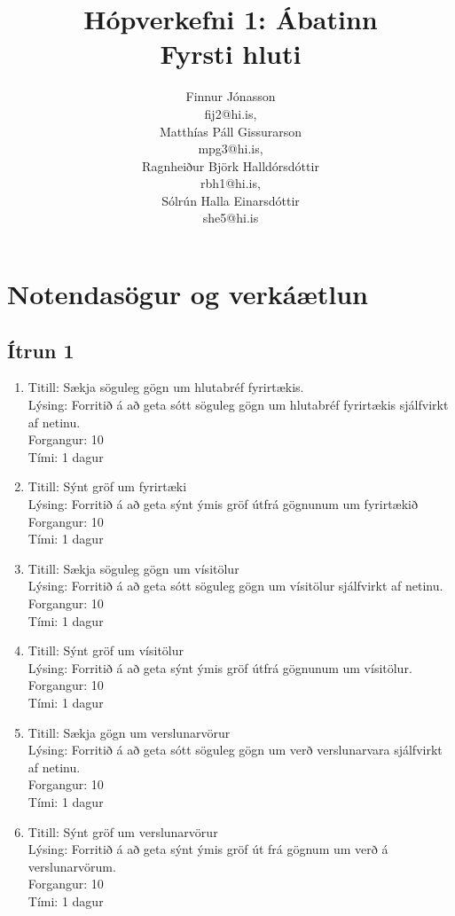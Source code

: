 \documentclass[a4,12pt]{article}
\author{
Finnur Jónasson\\ fij2@hi.is,\\
Matthías Páll Gissurarson\\ mpg3@hi.is,\\
Ragnheiður Björk Halldórsdóttir\\ rbh1@hi.is,\\
Sólrún Halla Einarsdóttir\\ she5@hi.is
}
\title{Hópverkefni 1: Ábatinn\\
Fyrsti hluti}
\begin{document}
\maketitle

\section{Notendasögur og verkáætlun}

\subsection{Ítrun 1}
\begin{enumerate}[]

\item Titill: Sækja söguleg gögn um hlutabréf fyrirtækis.\\
Lýsing: Forritið á að geta sótt söguleg gögn um hlutabréf fyrirtækis sjálfvirkt af netinu.\\
Forgangur: 10\\
Tími: 1 dagur

\item Titill: Sýnt gröf um fyrirtæki\\
Lýsing: Forritið á að geta sýnt ýmis gröf útfrá gögnunum um fyrirtækið
Forgangur: 10\\
Tími: 1 dagur

\item Titill: Sækja söguleg gögn um vísitölur\\
Lýsing: Forritið á að geta sótt söguleg gögn um vísitölur sjálfvirkt af netinu.\\
Forgangur: 10\\
Tími: 1 dagur

\item Titill: Sýnt gröf um vísitölur\\
Lýsing: Forritið á að geta sýnt ýmis gröf útfrá gögnunum um vísitölur.\\
Forgangur: 10\\
Tími: 1 dagur

\item Titill: Sækja gögn um verslunarvörur\\
Lýsing: Forritið á að geta sótt söguleg gögn um verð verslunarvara sjálfvirkt af netinu.\\
Forgangur: 10\\
Tími: 1 dagur

\item Titill: Sýnt gröf um verslunarvörur\\
Lýsing: Forritið á að geta sýnt ýmis gröf út frá gögnum um verð á verslunarvörum.\\
Forgangur: 10\\
Tími: 1 dagur


\end{enumerate}
\end{document}
